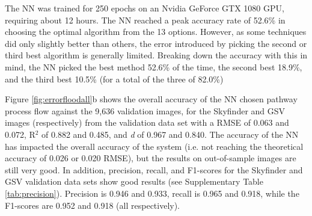 \documentclass[final,3p,times,authoryear]{elsarticle}
\begin{document}
The NN was trained for 250 epochs on an Nvidia GeForce GTX 1080 GPU, requiring about 12 hours. The NN reached a peak accuracy rate of 52.6\% in choosing the optimal algorithm from the 13 options. However, as some techniques did only slightly better than others, the error introduced by picking the second or third best algorithm is generally limited. Breaking down the accuracy with this in mind, the NN picked the best method 52.6\% of the time, the second best 18.9\%, and the third best 10.5\% (for a total of the three of 82.0\%)

Figure \ref{fig:errorfloodall}b shows the overall accuracy of the NN chosen pathway process flow against the 9,636 validation images, for the Skyfinder and GSV images (respectively) from the validation data set with a RMSE of 0.063 and 0.072, R$^{2}$ of 0.882 and 0.485, and \textit{d} of 0.967 and 0.840. The accuracy of the NN has impacted the overall accuracy of the system (i.e. not reaching the theoretical accuracy of 0.026 or 0.020 RMSE), but the results on out-of-sample images are still very good. In addition, precision, recall, and F1-scores for the Skyfinder and GSV validation data sets show good results (see Supplementary Table \ref{tab:precision}). Precision is 0.946 and 0.933, recall is 0.965 and 0.918, while the F1-scores are 0.952 and 0.918 (all respectively).




\end{document}
